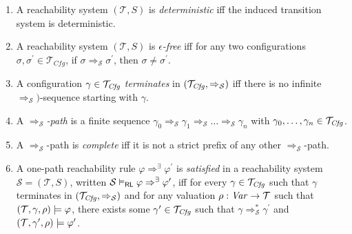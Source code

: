 \begin{definition}
\begin{enumerate}
    \item A reachability system $(\mathcal{T}, S)$ is \emph{deterministic} iff the induced transition system
          is deterministic.
          
    \item A reachability system $(\mathcal{T}, S)$ is \emph{$\epsilon$-free}
          iff for any two configurations $\sigma, \sigma^\prime \in \mathcal{T}_{\mathit{Cfg}}$, if
          $\sigma \Rightarrow_{\mathcal{S}} \sigma^\prime$, then $\sigma \not = \sigma^\prime$.

    \item A configuration $\gamma \in \mathcal{T}_{\mathit{Cfg}}$ \emph{terminates} in $(\mathcal{T}_{\mathit{Cfg}} , \Rightarrow_{\mathcal{S}})$
          iff there is no infinite $\Rightarrow_{\mathcal{S}})$-sequence starting with $\gamma$.
          
    \item A \emph{$\Rightarrow_{\mathcal{S}}$-path} is a finite
          sequence $\gamma_0 \Rightarrow_{\mathcal{S}} \gamma_1 \Rightarrow_{\mathcal{S}} \ldots
          \Rightarrow_{\mathcal{S}} \gamma_n$
          with $\gamma_0,\ldots,\gamma_n \in \mathcal{T}_{\mathit{Cfg}}$.
          
    \item A $\Rightarrow_{\mathcal{S}}$-path is \emph{complete}
          iff it is not a strict prefix of any
          other $\Rightarrow_{\mathcal{S}}$-path.

    \item \label{def:oprlSemantics}
          A one-path reachability rule $\varphi \Rightarrow^\exists \varphi^\prime$ is \emph{satisfied}
          in a reachability system $\mathcal{S} = (\mathcal{T}, S)$,
          written $\mathcal{S} \vDash_{\mathsf{RL}} \varphi \Rightarrow^\exists \varphi^\prime$,
          iff for every $\gamma \in \mathcal{T}_{\mathit{Cfg}}$
          such that $\gamma$ terminates in $(\mathcal{T}_{\mathit{Cfg}}, \Rightarrow_{\mathcal{S}})$
          and for any valuation $\rho : \mathit{Var} \to \mathcal{T}$
          such that $(\mathcal{T}, \gamma, \rho) \models \varphi$,
          there exists some $\gamma^\prime \in \mathcal{T}_{\mathit{Cfg}}$
          such that
          $\gamma \Rightarrow^{*}_{\mathcal{S}} \gamma^\prime$
          and $(\mathcal{T}, \gamma^\prime, \rho) \models \varphi^\prime$.
          
          
%    
\end{enumerate}


\end{definition}

